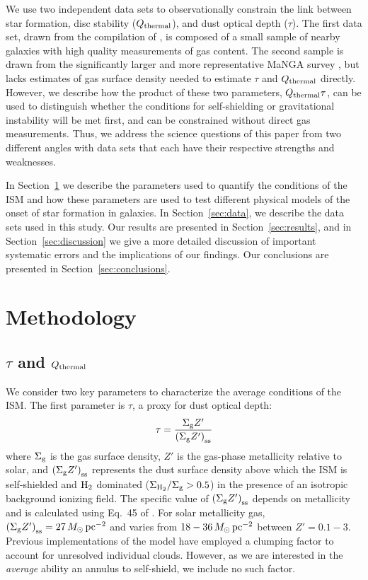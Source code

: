 \documentclass[fleqn,usenatbib]{mnras}
\newcommand{\msun}{M_{\odot}}
\newcommand{\qh}{Q_{\rm thermal}}
\begin{document}
We use two independent data sets to observationally constrain the link between star formation, disc stability ($Q_{\rm thermal}$), and dust optical depth ($\tau$). The first data set, drawn from the compilation of \citet{Leroy08}, is composed of a small sample of nearby galaxies with high quality measurements of gas content. The second sample is drawn from the significantly larger and more representative MaNGA survey \citep{Bundy15}, but lacks estimates of gas surface density needed to estimate $\tau$ and $\qh$ directly.  However, we describe how the product of these two parameters, $\qh \tau$, can be used to distinguish whether the conditions for self-shielding or gravitational instability will be met first, and can be constrained without direct gas measurements. Thus, we address the science questions of this paper from two different angles with data sets that each have their respective strengths and weaknesses.  

In Section~\ref{sec:methods} we describe the parameters used to quantify the conditions of the ISM and how these parameters are used to test different physical models of the onset of star formation in galaxies. In Section~\ref{sec:data}, we describe the data sets used in this study. Our results are presented in Section~\ref{sec:results}, and in Section~\ref{sec:discussion} we give a more detailed discussion of important systematic errors and the implications of our findings.  Our conclusions are presented in Section~\ref{sec:conclusions}.

\section{Methodology} 
\label{sec:methods}

\subsection{$\tau$ and $\qh$}
\label{sec:qtau}
We consider two key parameters to characterize the average conditions of the ISM. The first parameter is $\tau$, a proxy for dust optical depth:
\begin{equation}
\label{eq:tau}
\tau=\frac{\Sigma_{\rm g}Z'}{\left(\Sigma_{\rm g} Z'\right)_{\rm ss}}
\end{equation}
where $\Sigma_{\rm g}$ is the gas surface density, $Z'$ is the gas-phase metallicity relative to solar, and $\left(\Sigma_{\rm g} Z'\right)_{\rm ss}$ represents the dust surface density above which the ISM is self-shielded and ${\rm H_2}$ dominated (${\Sigma_{\rm H_2}}/{\Sigma_{\rm g}} > 0.5$) in the presence of an isotropic background ionizing field. The specific value of $\left(\Sigma_{\rm g} Z'\right)_{\rm ss}$ depends on metallicity and is calculated using Eq.~45 of \citet{Krumholz09}.  For solar metallicity gas, \mbox{$\left(\Sigma_{\rm g} Z'\right)_{\rm ss}=27\,\msun\,{\rm pc^{-2}}$} and varies from \mbox{$18-36 \, \msun \,{\rm pc^{-2}}$} between \mbox{$Z'=0.1-3$}.  Previous implementations of the \citet{Krumholz09} model have employed a clumping factor to account for unresolved individual clouds.  However, as we are interested in the {\it average} ability an annulus to self-shield, we include no such factor.
\end{document}
